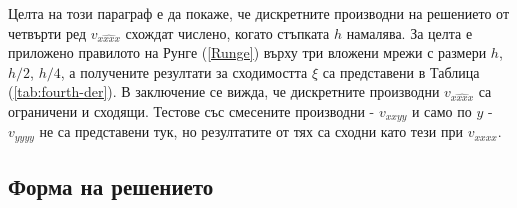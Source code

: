\documentclass{article}
\newcommand{\rf}[1]{(\ref{#1})}
\begin{document}
\FloatBarrier
Целта на този параграф е да покаже, че дискретните производни на решението от четвърти ред $v_{\widehat{xxxx}}$ схождат числено, когато стъпката $h$ намалява. За целта е приложено правилото на Рунге \rf{Runge} върху три вложени мрежи с размери $h$, $h/2$, $h/4$, а получените резултати за сходимостта $\xi$ са представени в Таблица \rf{tab:fourth-der}. В заключение се вижда, че дискретните производни $v_{\widehat{xxxx}}$ са ограничени и сходящи. Тестове със смесените производни - $v_{xxyy}$ и само по $y$ - $v_{yyyy}$ не са представени тук, но резултатите от тях са сходни като тези при $v_{xxxx}$.

\subsection{Форма на решението}
\end{document}
